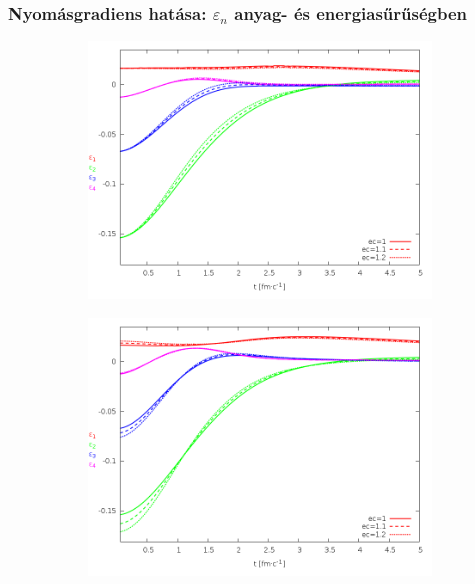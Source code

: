 \documentclass{beamer}
\begin{document}
\begin{frame}[noframenumbering]
\frametitle{Nyomásgradiens hatása: $\varepsilon_n$ anyag- és energiasűrűségben}
\begin{center}
\begin{figure}[H]
	\centering
    \begin{subfigure}[b]{0.49\textwidth}
    		\includegraphics[width=\textwidth]{pic/res/nonrel/eps_ec_r}
	\end{subfigure}
	\begin{subfigure}[b]{0.49\textwidth}
        	\includegraphics[width=\textwidth]{pic/res/nonrel/eps_ec_p}
	\end{subfigure}
\end{figure}
\end{center}
\end{frame}
\end{document}
